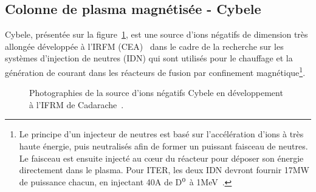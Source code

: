\begin{refsection}
\section{Colonne de plasma magnétisée - Cybele}
Cybele, présentée sur la figure~\ref{4-cybelePhoto}, est une source d'ions
négatifs de dimension très allongée développée à
l'IRFM (CEA)~\cite{Simonin} dans le cadre de la recherche sur les systèmes
d'injection de neutres (IDN) qui sont utilisés pour le chauffage et la
génération de courant dans les réacteurs de fusion par confinement magnétique\footnote{Le principe d'un
injecteur de neutres est basé sur l'accélération d'ions à très haute énergie,
puis neutralisés afin de former un puissant faisceau de neutres.
Le faisceau est ensuite injecté au c\oe{}ur du réacteur pour déposer son énergie
directement dans le plasma. Pour ITER, les deux IDN devront fournir 17MW de
puissance chacun, en injectant 40A de D$^{{0}}$ à
1MeV~\parencite{Hemsworth}.}.
\begin{figure}[!htbp]
  \centering
    \caption{Photographies de la source d'ions négatifs Cybele en développement
    à l'IFRM de Cadarache~\parencite{SimoninHDR}.
    \label{4-cybelePhoto}} 
\end{figure}	


\end{refsection}
